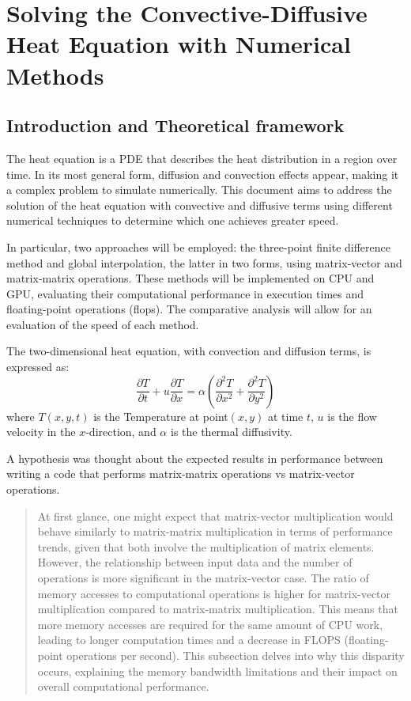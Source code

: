 


\newpage

\section{Solving the Convective-Diffusive Heat Equation with Numerical Methods}

\subsection{Introduction and Theoretical framework} \label{s:subsection_1}



The heat equation is a PDE that describes the heat distribution in a region over time. In its most general form,  diffusion and convection effects appear, making it a complex problem to simulate numerically. This document aims to address the solution of the heat equation with convective and diffusive terms using different numerical techniques to determine which one achieves greater speed.

In particular, two approaches will be employed: the three-point finite difference method and global interpolation, the latter in two forms, using matrix-vector and matrix-matrix operations. These methods will be implemented  on CPU and GPU, evaluating their computational performance in execution times and floating-point operations (flops). The comparative analysis will allow for an evaluation of the speed of each method.

The two-dimensional heat equation, with convection and diffusion terms, is expressed as:
\[
\frac{\partial T}{\partial t} + u \frac{\partial T}{\partial x} = \alpha \left( \frac{\partial^2 T}{\partial x^2} + \frac{\partial^2 T}{\partial y^2} \right)
\]
where \( T(x,y,t) \) is the Temperature at point\( (x,y) \) at time \( t \), \( u \) is the flow velocity in the \( x \)-direction, and \( \alpha \) is the thermal diffusivity.

A hypothesis was thought about the expected results in performance between writing a code that performs matrix-matrix operations vs matrix-vector operations.
\begin{quote}
At first glance, one might expect that matrix-vector multiplication would behave similarly
to matrix-matrix multiplication in terms of performance trends, given that both involve the
multiplication of matrix elements. However, the relationship between input data and the
number of operations is more significant in the matrix-vector case. The ratio of memory
accesses to computational operations is higher for matrix-vector multiplication compared
to matrix-matrix multiplication. This means that more memory accesses are
required for the same amount of CPU work, leading to longer computation times and a
decrease in FLOPS (floating-point operations per second). This subsection delves into why this
disparity occurs, explaining the memory bandwidth limitations and their impact on overall
computational performance.
\end{quote}

